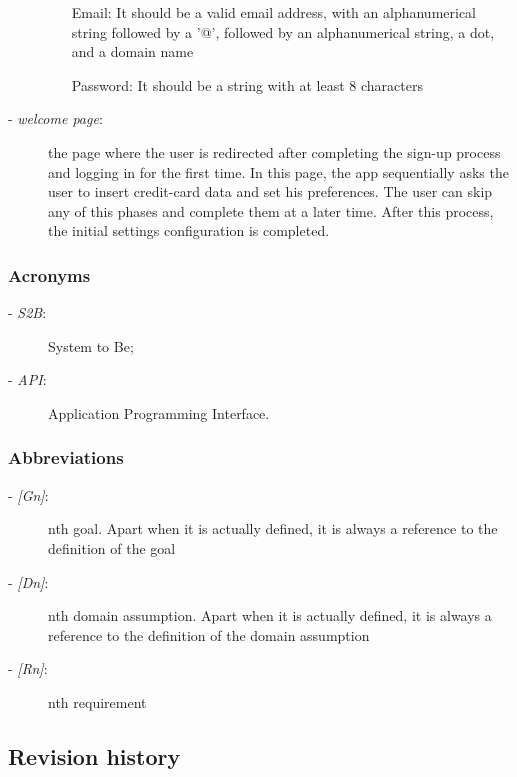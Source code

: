 \begin{description}
\begin{itemize}
				\item[Email:] It should be a valid email address, with an alphanumerical string followed by a '@', followed by an alphanumerical string, a dot, and a domain name
				\item[Password:] It should be a string with at least 8 characters
			\end{itemize}
			\item[- \textit{welcome page}:] the page where the user is redirected after completing the sign-up process and logging in for the first time. In this page, the app sequentially asks the user to insert credit-card data and set his preferences. The user can skip any of this phases and complete them at a later time. After this process, the initial settings configuration is completed.
		\end{description}
	\subsubsection{Acronyms}
		\begin{description}
		\item[- \textit{S2B}:] System to Be;
		\item[- \textit{API}:] Application Programming Interface.
	\end{description}
	\subsubsection{Abbreviations}
		\begin{description}
			\item[- \textit{[Gn]}:] nth goal. Apart when it is actually defined, it is always a reference to the definition of the goal
			\item[- \textit{[Dn]}:] nth domain assumption. Apart when it is actually defined, it is always a reference to the definition of the domain assumption
			\item[- \textit{[Rn]}:] nth requirement
		\end{description}
\subsection{Revision history}
